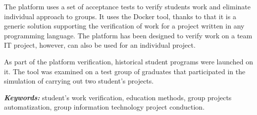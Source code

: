 The platform uses a set of acceptance tests to verify students work and eliminate individual approach to groups.
It uses the Docker tool, thanks to that it is a generic solution supporting the verification of work for a project written in any programming language.
The platform has been designed to verify work on a team IT project, however, can also be used for an individual project.

As part of the platform verification, historical student programs were launched on it.
The tool was examined on a test group of graduates that participated in the simulation of carrying out two student's projects. \newline

\textit{\textbf{Keywords:}} student's work verification, education methods, group projects automatization, group information technology project conduction.

\cleardoublepage
